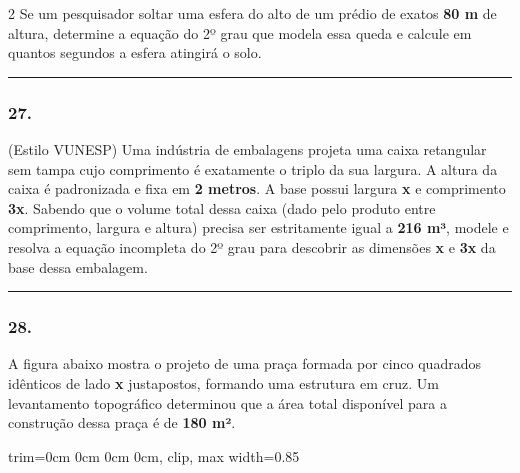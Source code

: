 \documentclass[twoside, 10pt, a4paper]{article}
\newlength{\espacoPreQuestao}\setlength{\espacoPreQuestao}{0.1cm}
\newlength{\espacoQuestao}\setlength{\espacoQuestao}{0.2cm}
\newcommand{\larguraTikz}{0.85\linewidth}
\begin{document}
\begin{multicols*}{2}
Se um pesquisador soltar uma esfera do alto de um prédio de exatos \textbf{80 m} de altura, determine a equação do 2º grau que modela essa queda e calcule em quantos segundos a esfera atingirá o solo.
\par\vspace{\espacoQuestao}

\noindent\textcolor{CorLinha}{\rule{\linewidth}{0.5pt}} 
\par\vspace{\espacoPreQuestao}
\subsubsection*{27.} (Estilo VUNESP) Uma indústria de embalagens projeta uma caixa retangular sem tampa cujo comprimento é exatamente o triplo da sua largura. A altura da caixa é padronizada e fixa em \textbf{2 metros}. A base possui largura \textbf{x} e comprimento \textbf{3x}. Sabendo que o volume total dessa caixa (dado pelo produto entre comprimento, largura e altura) precisa ser estritamente igual a \textbf{216 m³}, modele e resolva a equação incompleta do 2º grau para descobrir as dimensões \textbf{x} e \textbf{3x} da base dessa embalagem.
\par\vspace{\espacoQuestao}

\noindent\textcolor{CorLinha}{\rule{\linewidth}{0.5pt}} 
\par\vspace{\espacoPreQuestao}
\subsubsection*{28.} A figura abaixo mostra o projeto de uma praça formada por cinco quadrados idênticos de lado \textbf{x} justapostos, formando uma estrutura em cruz. Um levantamento topográfico determinou que a área total disponível para a construção dessa praça é de \textbf{180 m²}.

\begin{center}
\begin{adjustbox}{trim=0cm 0cm 0cm 0cm, clip, max width=\larguraTikz}
\end{adjustbox}
\end{center}
\end{multicols*}
\end{document}
